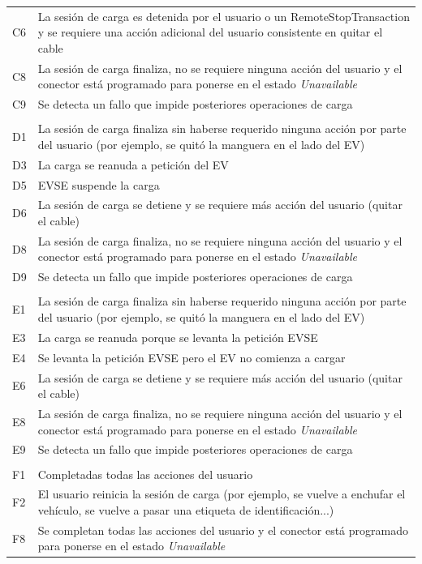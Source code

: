 \documentclass[12pt,a4paper,onecolumn,oneside]{report}
\begin{document}
\begin{longtable}{|p{1cm}|p{14cm}|}
C6 & La sesión de carga es detenida por el usuario o un RemoteStopTransaction y se requiere una acción adicional del usuario consistente en quitar el cable\\
C8 & La sesión de carga finaliza, no se requiere ninguna acción del usuario y el conector está programado para ponerse en el estado \textit{Unavailable}\\
C9 & Se detecta un fallo que impide posteriores operaciones de carga \\
 & \\
D1 & La sesión de carga finaliza sin haberse requerido ninguna acción por parte del usuario (por ejemplo, se quitó la manguera en el lado del EV)\\
D3 & La carga se reanuda a petición del EV\\
D5 & EVSE suspende la carga\\
D6 & La sesión de carga se detiene y se requiere más acción del usuario (quitar el cable)\\
D8 & La sesión de carga finaliza, no se requiere ninguna acción del usuario y el conector está programado para ponerse en el estado \textit{Unavailable}\\
D9 & Se detecta un fallo que impide posteriores operaciones de carga \\
 & \\
E1 & La sesión de carga finaliza sin haberse requerido ninguna acción por parte del usuario (por ejemplo, se quitó la manguera en el lado del EV)\\
E3 & La carga se reanuda porque se levanta la petición EVSE\\
E4 & Se levanta la petición EVSE pero el EV no comienza a cargar\\
E6 & La sesión de carga se detiene y se requiere más acción del usuario (quitar el cable)\\
E8 & La sesión de carga finaliza, no se requiere ninguna acción del usuario y el conector está programado para ponerse en el estado \textit{Unavailable}\\
E9 & Se detecta un fallo que impide posteriores operaciones de carga \\
 & \\
F1 & Completadas todas las acciones del usuario \\
F2 & El usuario reinicia la sesión de carga (por ejemplo, se vuelve a enchufar el vehículo, se vuelve a pasar una etiqueta de identificación...) \\ 
F8 & Se completan todas las acciones del usuario y el conector está programado para ponerse en el estado \textit{Unavailable}\\

\end{longtable}
\end{document}
